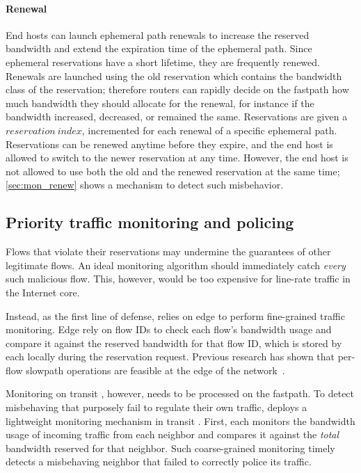 \paragraph{Renewal} End hosts can launch ephemeral path renewals to increase
the reserved bandwidth and extend the expiration time of the ephemeral path.
Since ephemeral reservations have a short lifetime, they are frequently
renewed. Renewals are launched using the old reservation which contains the
bandwidth class of the reservation; therefore routers can rapidly decide on the
fastpath how much bandwidth they should allocate for the renewal, for instance
if the bandwidth increased, decreased, or remained the same. Reservations are
given a $\mathit{reservation}\ \mathit{index}$, incremented for each renewal of a specific
ephemeral path. Reservations can be renewed anytime before they expire, and the
end host is allowed to switch to the newer reservation at any time. However,
the end host is not allowed to use both the old and the renewed reservation at
the same time; \autoref{sec:mon_renew} shows a mechanism to detect such
misbehavior.


\subsection{Priority traffic monitoring and policing}
\label{sec:mon}

\noindent Flows that violate their reservations may undermine the
guarantees of other legitimate flows. An ideal monitoring algorithm
should immediately catch \emph{every} such malicious flow. This,
however, would be too expensive for line-rate traffic in the Internet
core.

Instead, as the first line of defense, \name relies on edge \ADs to perform fine-grained traffic
monitoring.  Edge \ADs rely on flow IDs to check each flow's bandwidth usage
and compare it against the reserved bandwidth for that flow ID, which is stored
by each \AD locally during the reservation request.  Previous research has
shown that per-flow slowpath operations are feasible at the edge of the
network~\cite{Stoica2003}.

Monitoring on transit \ADs, however, needs to be processed on the fastpath.  To
detect misbehaving \ADs that purposely fail to regulate their own traffic,
\name deploys a lightweight monitoring mechanism in transit \ADs. First, each
\AD monitors the bandwidth usage of incoming traffic from each neighbor \AD and
compares it against the \emph{total} bandwidth reserved for that neighbor. Such
coarse-grained monitoring timely detects a misbehaving neighbor that
failed to correctly police its traffic.

